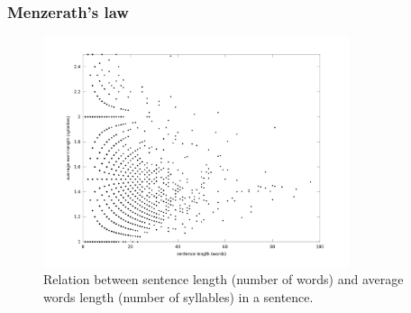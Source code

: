 \documentclass[notes]{beamer}
\begin{document}
\frame
{
  \frametitle{Menzerath's law}
  \vspace{-0.3cm}
  \begin{figure}[h]
  \centering
  \includegraphics[width=0.8\textwidth]{images/ulysses_words_sentence_word_length_syllables_z100.png}
  \caption{Relation between sentence length (number of words) and average words length (number of syllables) in a sentence.}
  \label{fig:ulysses_words_sentence_word_length}
  \end{figure}
}
\end{document}
